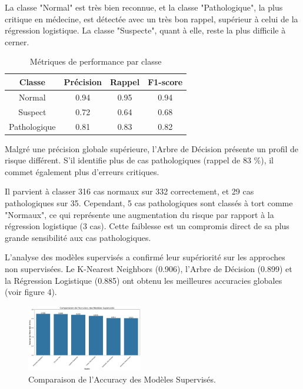 \documentclass[twocolumn,10pt]{article}
\begin{document}
La classe "Normal" est très bien reconnue, et la classe "Pathologique", la plus critique en médecine, est détectée avec un très bon rappel, supérieur à celui de la régression logistique. La classe "Suspecte", quant à elle, reste la plus difficile à cerner.

\begin{table}[htbp]
\centering
\caption{\label{tab:perf}Métriques de performance par classe}
\begin{tabular}{cccc}
\toprule
Classe & Précision & Rappel & F1-score \\
\midrule
Normal & 0.94 & 0.95 & 0.94 \\
Suspect & 0.72 & 0.64 & 0.68 \\
Pathologique & 0.81 & 0.83 & 0.82 \\
\bottomrule
\end{tabular}
\end{table}

Malgré une précision globale supérieure, l'Arbre de Décision présente un profil de risque différent. S'il identifie plus de cas pathologiques (rappel de 83 \%), il commet également plus d'erreurs critiques.

Il parvient à classer 316 cas normaux sur 332 correctement, et 29 cas pathologiques sur 35. Cependant, 5 cas pathologiques sont classés à tort comme "Normaux", ce qui représente une augmentation du risque par rapport à la régression logistique (3 cas). Cette faiblesse est un compromis direct de sa plus grande sensibilité aux cas pathologiques.




L'analyse des modèles supervisés a confirmé leur supériorité sur les approches non supervisées. Le K-Nearest Neighbors (0.906), l'Arbre de Décision (0.899) et la Régression Logistique (0.885) ont obtenu les meilleures accuracies globales (voir figure 4).


\begin{figure}[H]
    \centering
    \includegraphics[width=0.45\textwidth]{projet/accuracy.png}
    \caption{Comparaison de l'Accuracy des Modèles Supervisés.}
    \label{fig:k_means}
\end{figure}
\end{document}
